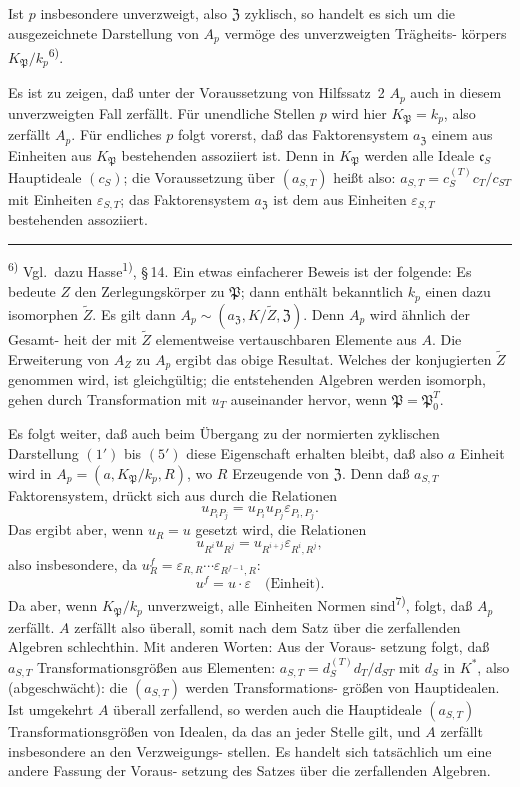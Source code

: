 \documentclass[12pt,a4paper]{article}
\theoremstyle{plain}
\begin{document}
Ist $p$ insbesondere unverzweigt, also $\mathfrak{Z}$ zyklisch, so handelt es sich um die
ausgezeichnete Darstellung von $A_p$ verm\"oge des unverzweigten Tr\"agheits-
k\"orpers $K_{\mathfrak{P}}/k_p$\textsuperscript{6)}.

Es ist zu zeigen, da\ss{} unter der Voraussetzung von Hilfssatz~2
$A_p$ auch in diesem unverzweigten Fall zerf\"allt. F\"ur unendliche Stellen $p$ wird
hier $K_{\mathfrak{P}} = k_p$, also zerf\"allt $A_p$. F\"ur endliches $p$ folgt vorerst, da\ss{} das
Faktorensystem $a_{\mathfrak{Z}}$ einem aus Einheiten aus $K_{\mathfrak{P}}$ bestehenden assoziiert ist.
Denn in $K_{\mathfrak{P}}$ werden alle Ideale $\mathfrak{c}_S$ Hauptideale $(c_S)$; die Voraussetzung
\"uber $(a_{S,T})$ hei\ss t also: $a_{S,T} = c_S^{(T)} c_T / c_{ST}$ mit Einheiten $\varepsilon_{S,T}$; das
Faktorensystem $a_{\mathfrak{Z}}$ ist dem aus Einheiten $\varepsilon_{S,T}$ bestehenden assoziiert.

\bigskip
\noindent\rule{0.3\textwidth}{0.4pt}

{\small
\textsuperscript{6)} Vgl.\ dazu Hasse\textsuperscript{1)}, \S\,14. Ein etwas einfacherer Beweis ist der folgende:
Es bedeute $Z$ den Zerlegungsk\"orper zu $\mathfrak{P}$; dann enth\"alt bekanntlich $k_p$ einen dazu
isomorphen $\tilde{Z}$. Es gilt dann $A_p \sim (a_{\mathfrak{Z}}, K/\tilde{Z}, \mathfrak{Z})$. Denn $A_p$ wird \"ahnlich der Gesamt-
heit der mit $\tilde{Z}$ elementweise vertauschbaren Elemente aus $A$. Die Erweiterung von $A_Z$
zu $A_p$ ergibt das obige Resultat.
Welches der konjugierten $\tilde{Z}$ genommen wird, ist gleichg\"ultig; die entstehenden
Algebren werden isomorph, gehen durch Transformation mit $u_T$ auseinander hervor,
wenn $\mathfrak{P} = \mathfrak{P}_0^T$.
}

\medskip
\noindent
Es folgt weiter, da\ss{} auch beim \"Ubergang zu der normierten zyklischen
Darstellung $(1')$ bis $(5')$ diese Eigenschaft erhalten bleibt, da\ss{} also $a$ Einheit
wird in $A_p = (a, K_{\mathfrak{P}}/k_p, R)$, wo $R$ Erzeugende von $\mathfrak{Z}$. Denn da\ss{} $a_{S,T}$
Faktorensystem, dr\"uckt sich aus durch die Relationen
\[
u_{P_i P_j} = u_{P_i} u_{P_j} \varepsilon_{P_i, P_j}.
\]
Das ergibt aber, wenn $u_R = u$ gesetzt wird, die Relationen
\[
u_{R^i} u_{R^j} = u_{R^{i+j}} \varepsilon_{R^i, R^j},
\]
also insbesondere, da $u_R^f = \varepsilon_{R,R} \cdots \varepsilon_{R^{f-1}, R}$:
\[
u^f = u \cdot \varepsilon \quad \text{(Einheit)}.
\]
Da aber, wenn $K_{\mathfrak{P}}/k_p$ unverzweigt, alle Einheiten Normen sind\textsuperscript{7)}, folgt,
da\ss{} $A_p$ zerf\"allt. $A$ zerf\"allt also \"uberall, somit nach dem Satz \"uber die
zerfallenden Algebren schlechthin. Mit anderen Worten: Aus der Voraus-
setzung folgt, da\ss{} $a_{S,T}$ Transformationsgr\"o\ss en aus Elementen: $a_{S,T} = d_S^{(T)} d_T / d_{ST}$
mit $d_S$ in $K^*$, also (abgeschw\"acht): die $(a_{S,T})$ werden Transformations-
gr\"o\ss en von Hauptidealen. Ist umgekehrt $A$ \"uberall zerfallend, so werden
auch die Hauptideale $(a_{S,T})$ Transformationsgr\"o\ss en von Idealen, da das
an jeder Stelle gilt, und $A$ zerf\"allt insbesondere an den Verzweigungs-
stellen. Es handelt sich tats\"achlich um eine andere Fassung der Voraus-
setzung des Satzes \"uber die zerfallenden Algebren.
\end{document}
